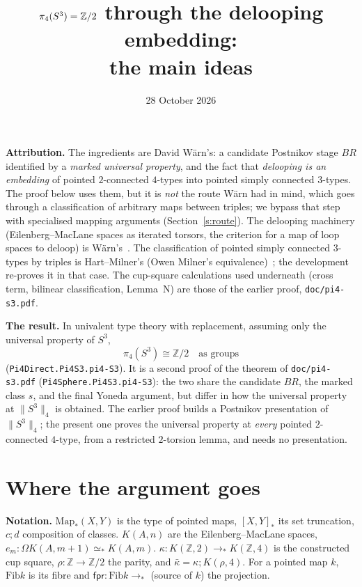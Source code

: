 \documentclass[11pt]{amsart}
\title{$\pi_4(S^3)=\Z/2$ through the delooping embedding:\\ the main ideas}
\date{28 October 2026}
\theoremstyle{definition}
\theoremstyle{remark}
\newcommand{\Om}{\Omega}
\newcommand{\Z}{\mathbb{Z}}
\newcommand{\code}[1]{\texttt{#1}}
\newcommand{\Map}{\mathrm{Map}_*}
\newcommand{\hc}[2]{[#1,#2]_*}
\newcommand{\Fib}{\mathrm{Fib}}
\newcommand{\fpr}{\mathsf{fpr}}
\newcommand{\tr}[1]{\|#1\|}
\newcommand{\kb}{\bar\kappa}
\newcommand{\pteq}{\simeq_*}
\begin{document}
\maketitle
\sloppy

\noindent\textbf{Attribution.} The ingredients are David W\"arn's: a
candidate Postnikov stage $BR$ identified by a \emph{marked universal property},
and the fact that \emph{delooping is an embedding} of pointed $2$-connected
$4$-types into pointed simply connected $3$-types. The proof below uses them,
but it is \emph{not} the route W\"arn had in mind, which goes through a
classification of arbitrary maps between triples; we bypass that step with
specialised mapping arguments (Section~\ref{s:route}). The delooping machinery (Eilenberg--MacLane spaces
as iterated torsors, the criterion for a map of loop spaces to deloop) is
W\"arn's~\cite{DW1}. The classification of pointed simply connected $3$-types by
triples is Hart--Milner's (Owen Milner's equivalence)~\cite{HM}; the
development re-proves it in that case. The cup-square
calculations used underneath (cross term, bilinear classification, Lemma~N)
are those of the earlier proof, \code{doc/pi4-s3.pdf}.

\smallskip\noindent\textbf{The result.} In univalent type theory with
replacement, assuming only the universal property of $S^3$,
\[\pi_4(S^3)\cong\Z/2\quad\text{as groups}\]
(\code{Pi4Direct.Pi4S3.pi4-S3}). It is a second proof of the theorem of
\code{doc/pi4-s3.pdf} (\code{Pi4Sphere.Pi4S3.pi4-S3}): the two share the
candidate $BR$, the marked class $s$, and the final Yoneda argument, but differ
in how the universal property at $\tr{S^3}_4$ is obtained. The earlier proof
builds a Postnikov presentation of $\tr{S^3}_4$; the present one proves the
universal property at \emph{every} pointed $2$-connected $4$-type, from a
restricted $2$-torsion lemma, and needs no presentation.

\section{Where the argument goes}

\noindent\textbf{Notation.} $\Map(X,Y)$ is the type of pointed maps,
$\hc XY$ its set truncation, $c;d$ composition of classes. $K(A,n)$ are the
Eilenberg--MacLane spaces, $e_m:\Om K(A,m{+}1)\pteq K(A,m)$. $\kappa:K(\Z,2)\to_*
K(\Z,4)$ is the constructed cup square, $\rho:\Z\to\Z/2$ the parity, and
$\kb=\kappa;K(\rho,4)$. For a pointed map $k$, $\Fib k$ is its fibre and
$\fpr:\Fib k\to_*$ (source of $k$) the projection.
\end{document}
